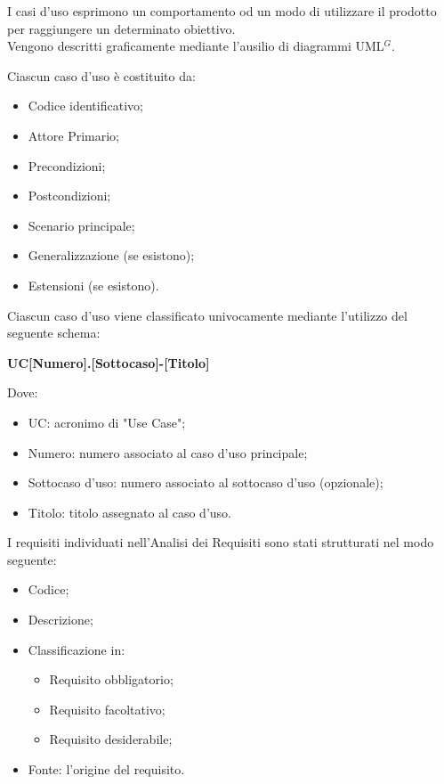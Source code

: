

    I casi d’uso esprimono un comportamento od un modo di utilizzare il prodotto per raggiungere un determinato obiettivo. \\
    Vengono descritti graficamente mediante l’ausilio di diagrammi UML$^{G}$. 

    Ciascun caso d’uso è costituito da:
    \begin{itemize}
        \item Codice identificativo;
        \item Attore Primario;
        \item Precondizioni;
        \item Postcondizioni;
        \item Scenario principale;
        \item Generalizzazione (se esistono);
        \item Estensioni (se esistono).
        
    \end{itemize}


    Ciascun caso d’uso viene classificato univocamente mediante l’utilizzo del seguente schema:

        \begin{center}
            \large{\textbf{UC[Numero].[Sottocaso]-[Titolo]}}
        \end{center}
    Dove:
    \begin{itemize}
        \item UC: acronimo di "Use Case";
        \item Numero: numero associato al caso d'uso principale;
        \item Sottocaso d'uso: numero associato al sottocaso d'uso (opzionale);
        \item Titolo: titolo assegnato al caso d'uso.
    \end{itemize}
    

    I requisiti individuati nell’Analisi dei Requisiti sono stati strutturati nel modo seguente:

    \begin{itemize}
        \item Codice;
        \item Descrizione;
        \item Classificazione in:  \begin{itemize}
                                        \item Requisito obbligatorio;
                                        \item Requisito facoltativo;
                                        \item Requisito desiderabile;
        \end{itemize}
        \item Fonte: l'origine del requisito.
    \end{itemize}

